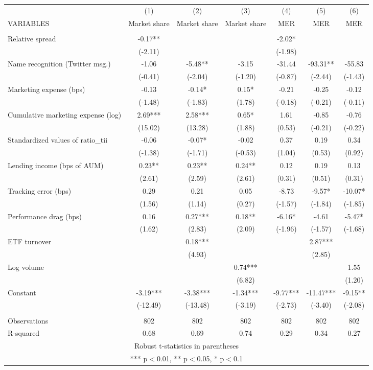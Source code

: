 \documentclass[]{article}
\begin{document}
\begin{tabular}{lcccccc} \hline
 & (1) & (2) & (3) & (4) & (5) & (6) \\
VARIABLES & Market share & Market share & Market share & MER & MER & MER \\ \hline
 &  &  &  &  &  &  \\
Relative spread & -0.17** &  &  & -2.02* &  &  \\
 & (-2.11) &  &  & (-1.98) &  &  \\
Name recognition (Twitter msg.) & -1.06 & -5.48** & -3.15 & -31.44 & -93.31** & -55.83 \\
 & (-0.41) & (-2.04) & (-1.20) & (-0.87) & (-2.44) & (-1.43) \\
Marketing expense (bps) & -0.13 & -0.14* & 0.15* & -0.21 & -0.25 & -0.12 \\
 & (-1.48) & (-1.83) & (1.78) & (-0.18) & (-0.21) & (-0.11) \\
Cumulative marketing expense (log) & 2.69*** & 2.58*** & 0.65* & 1.61 & -0.85 & -0.76 \\
 & (15.02) & (13.28) & (1.88) & (0.53) & (-0.21) & (-0.22) \\
Standardized values of ratio\_tii & -0.06 & -0.07* & -0.02 & 0.37 & 0.19 & 0.34 \\
 & (-1.38) & (-1.71) & (-0.53) & (1.04) & (0.53) & (0.92) \\
Lending income (bps of AUM) & 0.23** & 0.23** & 0.24** & 0.12 & 0.19 & 0.13 \\
 & (2.61) & (2.59) & (2.61) & (0.31) & (0.51) & (0.31) \\
Tracking error (bps) & 0.29 & 0.21 & 0.05 & -8.73 & -9.57* & -10.07* \\
 & (1.56) & (1.14) & (0.27) & (-1.57) & (-1.84) & (-1.85) \\
Performance drag (bps) & 0.16 & 0.27*** & 0.18** & -6.16* & -4.61 & -5.47* \\
 & (1.62) & (2.83) & (2.09) & (-1.96) & (-1.57) & (-1.68) \\
ETF turnover &  & 0.18*** &  &  & 2.87*** &  \\
 &  & (4.93) &  &  & (2.85) &  \\
Log volume &  &  & 0.74*** &  &  & 1.55 \\
 &  &  & (6.82) &  &  & (1.20) \\
Constant & -3.19*** & -3.38*** & -1.34*** & -9.77*** & -11.47*** & -9.15** \\
 & (-12.49) & (-13.48) & (-3.19) & (-2.73) & (-3.40) & (-2.08) \\
 &  &  &  &  &  &  \\
Observations & 802 & 802 & 802 & 802 & 802 & 802 \\
 R-squared & 0.68 & 0.69 & 0.74 & 0.29 & 0.34 & 0.27 \\ \hline
\multicolumn{7}{c}{ Robust t-statistics in parentheses} \\
\multicolumn{7}{c}{ *** p$<$0.01, ** p$<$0.05, * p$<$0.1} \\
\end{tabular}
\end{document}
